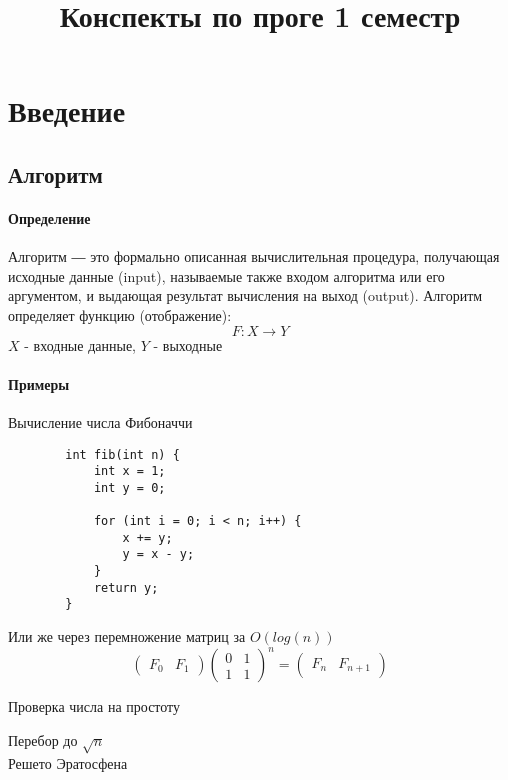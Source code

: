 \documentclass[a4paper,10pt]{article}
\title{Конспекты по проге 1 семестр}
\date{}
\begin{document}
	\maketitle
	\tableofcontents
	\newpage
	
	\section{Введение}
	\subsection{Алгоритм}
	\paragraph{Определение}
		Алгоритм ― это формально описанная вычислительная процедура, получающая исходные данные (input), называемые также входом алгоритма или его аргументом, и выдающая результат вычисления на выход (output).
		Алгоритм определяет функцию (отображение):
		\begin{equation}
			F \colon X \to Y
		\end{equation}
		$X$ - входные данные, $Y$ - выходные
	\paragraph{Примеры}
	\begin{center}
	Вычисление числа Фибоначчи
	\end{center}
	\begin{lstlisting}
		int fib(int n) {
			int x = 1;
			int y = 0;
			
			for (int i = 0; i < n; i++) {
				x += y;
				y = x - y;
			}
			return y;
		}
	\end{lstlisting}
	Или же через перемножение матриц за $O(log(n))$
	\[
	\begin{pmatrix}
		F_{0} & F_{1}
	\end{pmatrix}
	\begin{pmatrix}
		0 & 1 \\
		1 & 1
	\end{pmatrix} ^ {\!\!n}
	=
	\begin{pmatrix}
		F_{n} & F_{n+1}
	\end{pmatrix}
	\]

	\begin{center}
		Проверка числа на простоту
	\end{center}
	Перебор до $\sqrt{n}$ \\
	Решето Эратосфена
	
\end{document}
